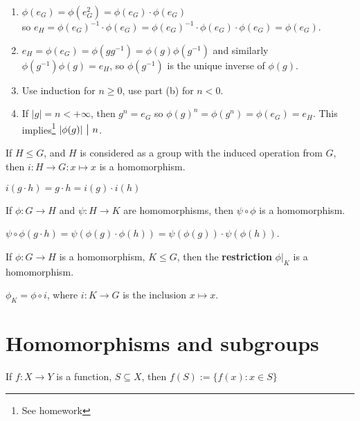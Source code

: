 \begin{pf}
\begin{enumerate}[label=(\alph*)]
\item $\phi(e_G)=\phi(e_G^2)=\phi(e_G)\cdot \phi(e_G)$\\
so $e_{H}=\phi\left(e_{G}\right)^{-1} \cdot \phi\left(e_{G}\right)=\phi\left(e_{G}\right)^{-1} \cdot \phi\left(e_{G}\right) \cdot \phi\left(e_{G}\right)=\phi\left(e_{G}\right)$.
\item $e_H=\phi(e_G)=\phi(gg^{-1})=\phi(g)\phi(g^{-1})$ and similarly $\phi(g^{-1})\phi(g)=e_H$, so $\phi(g^{-1})$ is the unique inverse of $\phi(g)$.
\item Use induction for $n\ge 0$, use part (b) for $n<0$.
\item If $|g|=n < +\infty$, then $g^n=e_G$ so $\phi(g)^n = \phi(g^n)=\phi(e_G)=e_H$. This implies\footnote{See homework} $|\phi(g)| \midd n$. 
\end{enumerate}
\end{pf}

\begin{lemma}
If $H\le G$, and $H$ is considered as a group with the induced operation from $G$, then $i:H\to G: x\mapsto x$ is a homomorphism.
\end{lemma}

\begin{pf}
$i(g\cdot h) = g\cdot h = i(g)\cdot i(h)$
\end{pf}

\begin{lemma}
If $\phi:G\to H$ and $\psi: H\to K$ are homomorphisms, then $\psi \circ \phi$ is a homomorphism.
\end{lemma}

\begin{pf}
$\psi \circ \phi(g \cdot h)=\psi(\phi(g) \cdot \phi(h))=\psi(\phi(g)) \cdot \psi(\phi(h))$.
\end{pf}


\begin{corr}
If $\phi:G\to H$ is a homomorphism, $K\le G$, then the \textbf{restriction} $\phi |_K$ is a homomorphism.
\end{corr}

\begin{pf}
$\phi_K = \phi\circ i$, where $i:K\to G$ is the inclusion $x\mapsto x$.
\end{pf}

\section{Homomorphisms and subgroups}
If $f:X\to Y$ is a function, $S\subseteq X$, then $f(S):=\{f(x):x\in S\}$

